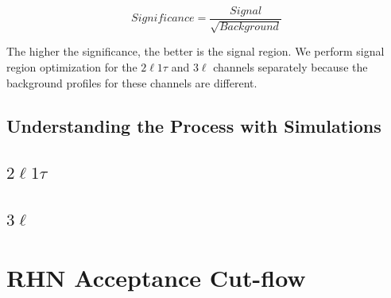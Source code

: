 \documentclass[letterpaper,12pt]{article}
\begin{document}
\[
Significance = \frac{Signal}{\sqrt{Background}}
\]

The higher the significance, the better is the signal region. We perform signal region optimization for the $2\ell1\tau$ and $3\ell$ channels separately because the background profiles for these channels are different.

\subsection{Understanding the Process with Simulations}
\label{sec:gen}

\subsection{\Large{\boldmath$2\ell1\tau$}}
\label{sec:2l1t}

\subsection{\Large{\boldmath$3\ell$}}
\label{sec:3l}

\section{RHN Acceptance Cut-flow}
\label{sec:cutflow}
\end{document}

